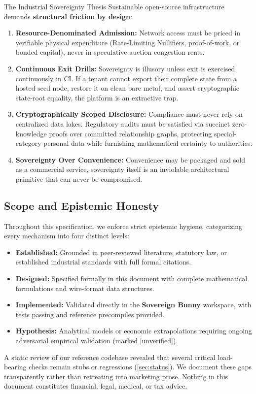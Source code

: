 \documentclass[a4paper,11pt,twoside,parskip=half-,headings=small]{scrartcl}
\newcommand{\claim}[1]{\textcolor{warn}{[#1]}}
\begin{document}
\begin{keybox}[unbreakable]{The Industrial Sovereignty Thesis}
Sustainable open-source infrastructure demands \textbf{structural friction by design}:
\begin{enumerate}[nosep, leftmargin=*]
  \item \textbf{Resource-Denominated Admission:} Network access must be priced in
verifiable physical expenditure (Rate-Limiting Nullifiers, proof-of-work, or
bonded capital), never in speculative auction congestion rents.
  \item \textbf{Continuous Exit Drills:} Sovereignty is illusory unless exit is
exercised continuously in CI. If a tenant cannot export their complete
state from a hosted seed node, restore it on clean bare metal, and assert
cryptographic state-root equality, the platform is an extractive trap.
  \item \textbf{Cryptographically Scoped Disclosure:} Compliance must never rely on
centralized data lakes. Regulatory audits must be satisfied via succinct
zero-knowledge proofs over committed relationship graphs, protecting special-category
personal data while furnishing mathematical certainty to authorities.
  \item \textbf{Sovereignty Over Convenience:} Convenience may be packaged and sold
as a commercial service, sovereignty itself is an inviolable architectural
primitive that can never be compromised.
\end{enumerate}
\end{keybox}

\subsection{Scope and Epistemic Honesty}

Throughout this specification, we enforce strict epistemic hygiene, categorizing
every mechanism into four distinct levels:
\begin{itemize}
  \item \textbf{Established:} Grounded in peer-reviewed literature, statutory law,
or established industrial standards with full formal citations.
  \item \textbf{Designed:} Specified formally in this document with complete
mathematical formulations and wire-format data structures.
  \item \textbf{Implemented:} Validated directly in the \textbf{Sovereign Bunny}
workspace, with tests passing and reference precompiles provided.
  \item \textbf{Hypothesis:} Analytical models or economic extrapolations
requiring ongoing adversarial empirical validation (marked \claim{unverified}).
\end{itemize}
A static review of our reference codebase revealed that several critical load-bearing
checks remain stubs or regressions (\cref{sec:status}). We document these gaps
transparently rather than retreating into marketing prose. Nothing in this document
constitutes financial, legal, medical, or tax advice.
\end{document}
